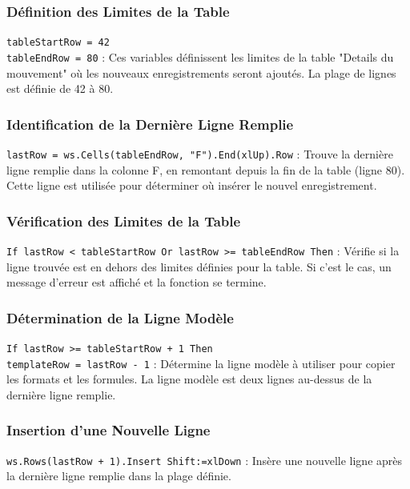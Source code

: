 \documentclass[a4paper, oneside, 12pt, final]{extreport}
\begin{document}
\subsubsection{Définition des Limites de la Table}

\texttt{tableStartRow = 42} \\
\texttt{tableEndRow = 80} : Ces variables définissent les limites de la table "Details du mouvement" où les nouveaux enregistrements seront ajoutés. La plage de lignes est définie de 42 à 80.

\subsubsection{Identification de la Dernière Ligne Remplie}

\texttt{lastRow = ws.Cells(tableEndRow, "F").End(xlUp).Row} : Trouve la dernière ligne remplie dans la colonne F, en remontant depuis la fin de la table (ligne 80). Cette ligne est utilisée pour déterminer où insérer le nouvel enregistrement.

\subsubsection{Vérification des Limites de la Table}

\texttt{If lastRow < tableStartRow Or lastRow >= tableEndRow Then} : Vérifie si la ligne trouvée est en dehors des limites définies pour la table. Si c'est le cas, un message d'erreur est affiché et la fonction se termine.

\subsubsection{Détermination de la Ligne Modèle}

\texttt{If lastRow >= tableStartRow + 1 Then} \\
\texttt{templateRow = lastRow - 1} : Détermine la ligne modèle à utiliser pour copier les formats et les formules. La ligne modèle est deux lignes au-dessus de la dernière ligne remplie.

\subsubsection{Insertion d'une Nouvelle Ligne}

\texttt{ws.Rows(lastRow + 1).Insert Shift:=xlDown} : Insère une nouvelle ligne après la dernière ligne remplie dans la plage définie.
\end{document}

